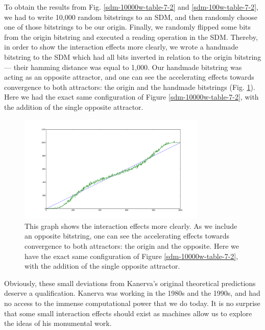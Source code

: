 To obtain the results from Fig. \ref{sdm-10000w-table-7-2} and \ref{sdm-100w-table-7-2}, we had to write 10,000 random bitstrings to an SDM, and then randomly choose one of those bitstrings to be our origin. Finally, we randomly flipped some bits from the origin bitstring and executed a reading operation in the SDM. Thereby, in order to show the interaction effects more clearly, we wrote a handmade bitstring to the SDM which had all bits inverted in relation to the origin bitstring --- their hamming distance was equal to 1,000. Our handmade bitstring was acting as an opposite attractor, and one can see the accelerating effects towards convergence to both attractors: the origin and the handmade bitstrings (Fig. \ref{sdm-10000w-notX-table-7-2}). Here we had the exact same configuration of Figure \ref{sdm-10000w-table-7-2}, with the addition of the single opposite attractor.

\begin{figure}[h]
\centering\includegraphics[width=0.8\textwidth]{images02/sdm-10000w-notX-table-7-2.png}
\caption{This graph shows the interaction effects more clearly.  As we include an opposite bitstring, one can see the accelerating effects towards convergence to both attractors: the origin and the opposite. Here we have the exact same configuration of Figure \ref{sdm-10000w-table-7-2}, with the addition of the single opposite attractor.
\label{sdm-10000w-notX-table-7-2}}
\end{figure}

Obviously, these small deviations from Kanerva's original theoretical predictions deserve a qualification.  Kanerva was working in the 1980s and the 1990s, and had no access to the immense computational power that we do today. It is no surprise that some small interaction effects should exist as machines allow us to explore the ideas of his monumental work.

